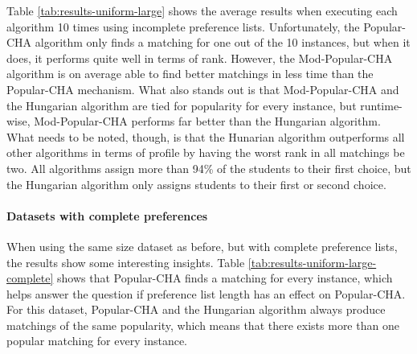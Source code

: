 Table \ref{tab:results-uniform-large} shows the average results when executing each algorithm 10 times using incomplete preference lists. Unfortunately, the Popular-CHA algorithm only finds a matching for one out of the 10 instances, but when it does, it performs quite well in terms of rank. However, the Mod-Popular-CHA algorithm is on average able to find better matchings in less time than the Popular-CHA mechanism. What also stands out is that Mod-Popular-CHA and the Hungarian algorithm are tied for popularity for every instance, but runtime-wise, Mod-Popular-CHA performs far better than the Hungarian algorithm. What needs to be noted, though, is that the Hunarian algorithm outperforms all other algorithms in terms of profile by having the worst rank in all matchings be two. All algorithms assign more than 94\% of the students to their first choice, but the Hungarian algorithm only assigns students to their first or second choice.  

\paragraph{Datasets with complete preferences}
When using the same size dataset as before, but with complete preference lists, the results show some interesting insights. Table \ref{tab:results-uniform-large-complete} shows that Popular-CHA finds a matching for every instance, which helps answer the question if preference list length has an effect on Popular-CHA. For this dataset, Popular-CHA and the Hungarian algorithm always produce matchings of the same popularity, which means that there exists more than one popular matching for every instance. 

\begin{table}[h!]
  \centering
  \caption{Average results for large uniform dataset with complete preferences.}
  \label{tab:results-uniform-large-complete}
\end{table}

